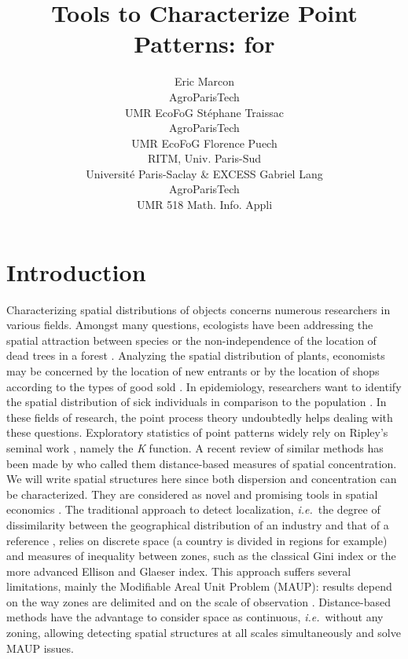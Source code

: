 \documentclass[nojss]{jss}
\author{Eric Marcon\\AgroParisTech\\UMR EcoFoG\And
        Stéphane Traissac\\AgroParisTech\\UMR EcoFoG\And
        Florence Puech\\RITM, Univ. Paris-Sud\\Université Paris-Saclay \& EXCESS\AND
        Gabriel Lang\\AgroParisTech\\ UMR 518 Math. Info. Appli\\
}
\title{Tools to Characterize Point Patterns: \pkg{dbmss} for \proglang{R}}
\begin{document}



\section{Introduction}
Characterizing spatial distributions of objects concerns numerous researchers in various fields. Amongst many questions, ecologists have been addressing the spatial attraction between species \citep{Duncan1991} or the non-independence of the location of dead trees in a forest \citep{Haase1997}. Analyzing the spatial distribution of plants, economists may be concerned by the location of new entrants \citep{Duranton2008} or by the location of shops according to the types of good sold \citep{Picone2009}. In epidemiology, researchers want to identify the spatial distribution of sick individuals in comparison to the population \citep{Diggle1991}. In these fields of research, the point process theory undoubtedly helps dealing with these questions. Exploratory statistics of point patterns widely rely on Ripley's seminal work \citep{Ripley1976, Ripley1977}, namely the \emph{K} function. A recent review of similar methods has been made by \cite{Marcon2012a} who called them distance-based measures of spatial concentration. We will write spatial structures here since both dispersion and concentration can be characterized. They are considered as novel and promising tools in spatial economics \citep{Combes2008}. The traditional approach to detect localization, \emph{i.e.}\ the degree of dissimilarity between the geographical distribution of an industry and that of a reference \citep{Hoover1936}, relies on discrete space (a country is divided in regions for example) and measures of inequality between zones, such as the classical Gini \citeyearpar{Gini1912} index or the more advanced Ellison and Glaeser \citeyearpar{Ellison1997} index. This approach suffers several limitations, mainly the Modifiable Areal Unit Problem (MAUP): results depend on the way zones are delimited and on the scale of observation \citep{Openshaw1979}. Distance-based methods have the advantage to consider space as continuous, \emph{i.e.}\ without any zoning, allowing detecting spatial structures at all scales simultaneously and solve MAUP issues.
\end{document}
